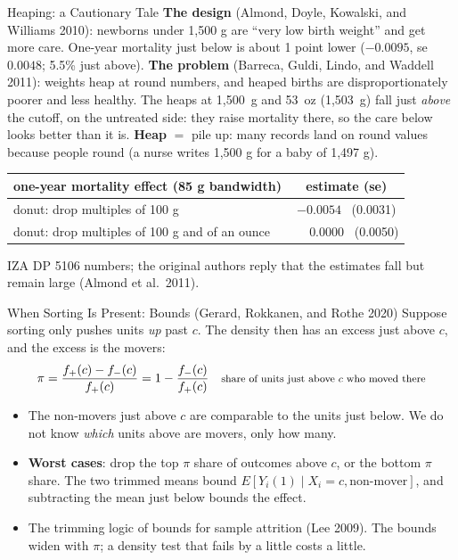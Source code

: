 \documentclass[aspectratio=169,11pt,xcolor=dvipsnames]{beamer}
\newcommand{\srcp}[1]{{\scriptsize\color{gray}(#1)}}
\newcommand{\E}{E}
\begin{document}
\begin{frame}{Heaping: a Cautionary Tale}
\textbf{The design} \srcp{Almond, Doyle, Kowalski, and Williams 2010}: newborns
under 1,500 g are ``very low birth weight'' and get more care. One-year mortality
just below is about 1 point lower ($-0.0095$, se $0.0048$; 5.5\% just above).
\vskip3pt
\textbf{The problem} \srcp{Barreca, Guldi, Lindo, and Waddell 2011}: weights
\alert{heap} at round numbers, and heaped births are disproportionately poorer and less
healthy. The heaps at 1,500~g and 53~oz (1,503~g) fall just \emph{above} the cutoff, on the
\alert{untreated} side: they raise mortality there, so the care below looks better than it is.
\vskip1pt
{\footnotesize \textbf{Heap} $=$ pile up: many records land on round values because people
round (a nurse writes 1,500 g for a baby of 1,497 g).}
\vskip-6pt
\begin{center}\footnotesize
\renewcommand{\arraystretch}{1.0}
\begin{tabular}{@{}lc@{}}
\toprule
one-year mortality effect (85 g bandwidth) & estimate (se) \\
\midrule
donut: drop multiples of 100 g & $-0.0054$ \ (0.0031) \\
donut: drop multiples of 100 g and of an ounce & $\phantom{-}0.0000$ \ (0.0050) \\
\bottomrule
\end{tabular}
\end{center}
\vskip-2pt
{\footnotesize IZA DP 5106 numbers; the original authors reply that the estimates fall but
remain large \srcp{Almond et al.\ 2011}.}
\end{frame}

\begin{frame}{When Sorting Is Present: Bounds \srcp{Gerard, Rokkanen, and Rothe 2020}}
Suppose sorting only pushes units \emph{up} past $c$. The density then has an
excess just above $c$, and the excess is the movers:
\begin{align*}
  \pi = \frac{f_+(c) - f_-(c)}{f_+(c)} = 1 - \frac{f_-(c)}{f_+(c)}
   && \text{\footnotesize share of units just above $c$ who moved there}
\end{align*}
\vskip-2pt
\begin{itemize}\itemsep3pt
  \item The non-movers just above $c$ are comparable to the units just below.
        We do not know \emph{which} units above are movers, only how many.
  \item \textbf{Worst cases}: drop the top $\pi$ share of outcomes above $c$,
        or the bottom $\pi$ share. The two trimmed means bound
        $\E[Y_i(1)\mid X_i = c, \text{non-mover}]$, and subtracting the mean
        just below bounds the effect.
  \item The trimming logic of bounds for sample attrition \srcp{Lee 2009}. The
        bounds widen with $\pi$; a density test that fails by a little costs a little.
\end{itemize}
\end{frame}
\end{document}
